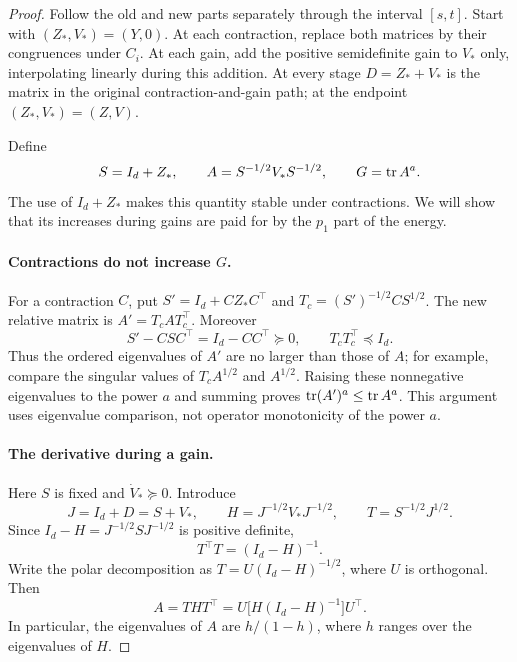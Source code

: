 \begin{proof}
Follow the old and new parts separately through the interval
$[s,t]$.  Start with $(Z_*,V_*)=(Y,0)$.  At each contraction,
replace both matrices by their congruences under $C_i$.  At each
gain, add the positive semidefinite gain to $V_*$ only, interpolating
linearly during this addition.  At every stage
$D=Z_*+V_*$ is the matrix in the original contraction-and-gain path;
at the endpoint $(Z_*,V_*)=(Z,V)$.

Define
\[
 S=I_d+Z_*,\qquad A=S^{-1/2}V_*S^{-1/2},\qquad
 G=\operatorname{tr} A^a.
\]
The use of $I_d+Z_*$ makes this quantity stable under contractions.
We will show that its increases during gains are paid for by the
$p_1$ part of the energy.

\paragraph{Contractions do not increase $G$.}
For a contraction $C$, put $S'=I_d+CZ_*C^\top$ and
$T_c=(S')^{-1/2}CS^{1/2}$.  The new relative matrix is
$A'=T_cAT_c^\top$.  Moreover
\[
 S'-CSC^\top=I_d-CC^\top\succeq0,
 \qquad T_cT_c^\top\preceq I_d.
\]
Thus the ordered eigenvalues of $A'$ are no larger than those of
$A$; for example, compare the singular values of $T_cA^{1/2}$
and $A^{1/2}$.  Raising these nonnegative eigenvalues to the power
$a$ and summing proves $\operatorname{tr}(A')^a\le\operatorname{tr} A^a$.
This argument uses eigenvalue comparison, not operator monotonicity
of the power $a$.

\paragraph{The derivative during a gain.}
Here $S$ is fixed and $\dot V_*\succeq0$.  Introduce
\[
 J=I_d+D=S+V_*,\qquad
 H=J^{-1/2}V_*J^{-1/2},\qquad
 T=S^{-1/2}J^{1/2}.
\]
Since $I_d-H=J^{-1/2}SJ^{-1/2}$ is positive definite,
\[
 T^\top T=(I_d-H)^{-1}.
\]
Write the polar decomposition as
$T=U(I_d-H)^{-1/2}$, where $U$ is orthogonal.  Then
\begin{equation}
 A=THT^\top
   =U\bigl[H(I_d-H)^{-1}\bigr]U^\top.
 \label{eq:relative-spectrum}
\end{equation}
In particular, the eigenvalues of $A$ are $h/(1-h)$, where $h$
ranges over the eigenvalues of $H$.


\end{proof}
